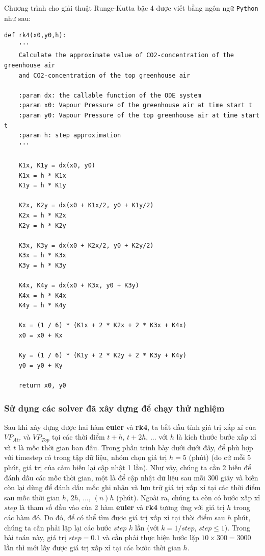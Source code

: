 \documentclass[a4paper]{article}
\begin{document}
Chương trình cho giải thuật Runge-Kutta bậc 4 được viết bằng ngôn ngữ \texttt{Python} như sau:

\begin{verbatim}
def rk4(x0,y0,h):
    '''
    Calculate the approximate value of CO2-concentration of the greenhouse air
    and CO2-concentration of the top greenhouse air

    :param dx: the callable function of the ODE system
    :param x0: Vapour Pressure of the greenhouse air at time start t
    :param y0: Vapour Pressure of the top greenhouse air at time start t
    :param h: step approximation
    '''

    K1x, K1y = dx(x0, y0)
    K1x = h * K1x
    K1y = h * K1y

    K2x, K2y = dx(x0 + K1x/2, y0 + K1y/2)
    K2x = h * K2x
    K2y = h * K2y

    K3x, K3y = dx(x0 + K2x/2, y0 + K2y/2)
    K3x = h * K3x
    K3y = h * K3y

    K4x, K4y = dx(x0 + K3x, y0 + K3y)
    K4x = h * K4x
    K4y = h * K4y

    Kx = (1 / 6) * (K1x + 2 * K2x + 2 * K3x + K4x)
    x0 = x0 + Kx

    Ky = (1 / 6) * (K1y + 2 * K2y + 2 * K3y + K4y)
    y0 = y0 + Ky

    return x0, y0
\end{verbatim}

\subsubsection{Sử dụng các solver đã xây dựng để chạy thử nghiệm}
Sau khi xây dựng được hai hàm \textbf{euler} và \textbf{rk4}, ta bắt đầu tính giá trị xấp xỉ của  $VP_{Air}$ và $VP_{Top}$ tại các thời điểm $t + h$, $t + 2h$, $...$ với $h$ là kích thước bước xấp xỉ và $t$ là mốc thời gian ban đầu. Trong phần trình bày dưới dưới đây, để phù hợp với timestep có trong tập dữ liệu, nhóm chọn giá trị $h = 5$ (phút) (do cứ mỗi 5 phút, giá trị của cảm biến lại cập nhật 1 lần). Như vậy, chúng ta cần 2 biến để đánh dấu các mốc thời gian, một là để cập nhật dữ liệu sau mỗi 300 giây và biến còn lại dùng để đánh dấu mốc ghi nhận và lưu trữ giá trị xấp xỉ tại các thời điểm sau mốc thời gian $h$, $2h$, $...$, $(n)h$ (phút). Ngoài ra, chúng ta còn có bước xấp xỉ $step$ là tham số đầu vào của 2 hàm \textbf{euler} và \textbf{rk4} tương ứng với giá trị $h$ trong các hàm đó. Do đó, để có thể tìm được giá trị xấp xỉ tại thòi điểm sau $h$ phút, chúng ta cần phải lặp lại các bước $step$ $k$ lần (với $k = 1/step$, $step \leq 1$). Trong bài toán này, giá trị $step = 0.1$ và cần phải thực hiện bước lặp $10 \times 300 = 3000$ lần thì mới lấy được giá trị xấp xỉ tại các bước thời gian $h$. \par
\end{document}
